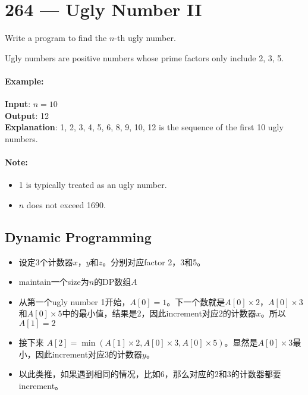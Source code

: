 \section{264 --- Ugly Number II}
Write a program to find the $n$-th ugly number.
\par
Ugly numbers are positive numbers whose prime factors only include 2, 3, 5. 

\paragraph{Example:}

\begin{flushleft}
\textbf{Input}: $n = 10$
\\
\textbf{Output}: 12
\\
\textbf{Explanation}: 1, 2, 3, 4, 5, 6, 8, 9, 10, 12 is the sequence of the first 10 ugly numbers.
\end{flushleft}

\paragraph{Note:}  

\begin{itemize}
\item 1 is typically treated as an ugly number.
\item $n$ does not exceed 1690.
\end{itemize}
\subsection{Dynamic Programming}
\begin{itemize}
\item 设定3个计数器$x$，$y$和$z$。分别对应factor 2，3和5。
\item maintain一个size为$n$的DP数组$A$
\item 从第一个ugly number 1开始，$A[0]=1$。下一个数就是$A[0]\times 2$，$A[0]\times 3$和$A[0]\times5$中的最小值，结果是2，因此increment对应2的计数器$x$。所以$A[1]=2$
\item 接下来 $A[2] = \min(A[1]\times2, A[0]\times 3, A[0]\times 5)$。显然是$A[0]\times 3$最小，因此increment对应3的计数器$y$。
\item 以此类推，如果遇到相同的情况，比如6，那么对应的2和3的计数器都要increment。
\end{itemize}



